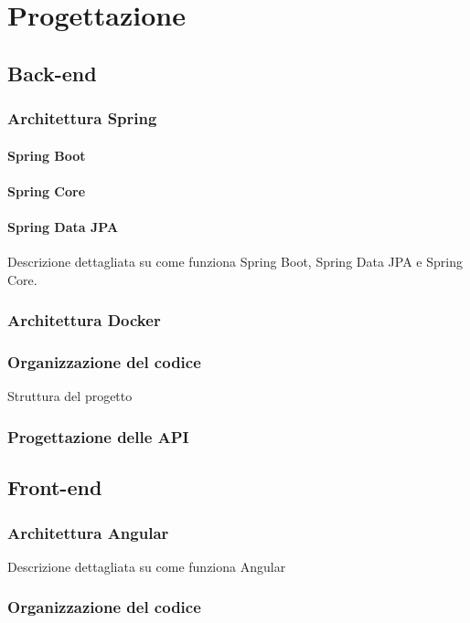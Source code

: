 \section{Progettazione}
\label{sec:progettazione}

\subsection{Back-end}
\subsubsection{Architettura Spring}
\paragraph{Spring Boot}
\paragraph{Spring Core}
\paragraph{Spring Data JPA}

Descrizione dettagliata su come funziona Spring Boot, Spring Data JPA e Spring Core.

\subsubsection{Architettura Docker}
\subsubsection{Organizzazione del codice}
Struttura del progetto
\subsubsection{Progettazione delle API}


\subsection{Front-end}
\subsubsection{Architettura Angular}
Descrizione dettagliata su come funziona Angular
\subsubsection{Organizzazione del codice}


